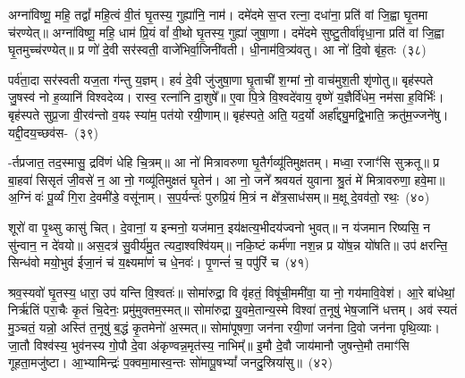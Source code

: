 {\anuvakamend[{भोज॑नानि॒ षड्विꣳ॑शतिश्च}]}%

अग्ना॑विष्णू॒ महि॒ तद्वां᳚ महि॒त्वं वी॒तं घृ॒तस्य॒ गुह्या॑नि॒ नाम॑। दमे॑दमे स॒प्त रत्ना॒ दधा॑ना॒ प्रति॑ वां जि॒ह्वा घृ॒तमा च॑रण्येत्॥ अग्ना॑विष्णू॒ महि॒ धाम॑ प्रि॒यं वां᳚ वी॒थो घृ॒तस्य॒ गुह्या॑ जुषा॒णा। दमे॑दमे सुष्टु॒तीर्वा॑वृधा॒ना प्रति॑ वां जि॒ह्वा घृ॒तमुच्च॑रण्येत्॥ प्र णो॑ दे॒वी सर॑स्वती॒ वाजे॑भिर्वा॒जिनी॑वती। धी॒नाम॑वि॒त्र्य॑वतु। आ नो॑ दि॒वो बृ॑ह॒तः~(३८)

पर्व॑ता॒दा सर॑स्वती यज॒ता ग॑न्तु य॒ज्ञम्। हवं॑ दे॒वी जु॑जुषा॒णा घृ॒ताची॑ श॒ग्मां नो॒ वाच॑मुश॒ती शृ॑णोतु॥ बृह॑स्पते जु॒षस्व॑ नो ह॒व्यानि॑ विश्वदेव्य। रास्व॒ रत्ना॑नि दा॒शुषे᳚॥ ए॒वा पि॒त्रे वि॒श्वदे॑वाय॒ वृष्णे॑ य॒ज्ञैर्वि॑धेम॒ नम॑सा ह॒विर्भिः॑। बृह॑स्पते सुप्र॒जा वी॒रव॑न्तो व॒यꣴ स्या॑म॒ पत॑यो रयी॒णाम्॥ बृह॑स्पते॒ अति॒ यद॒र्यो अर्\mbox{}हा᳚द्द्यु॒मद्वि॒भाति॒ क्रतु॑म॒ज्जने॑षु। यद्दी॒दय॒च्छव॑स-~(३९)

-र्तप्रजात॒ तद॒स्मासु॒ द्रवि॑णं धेहि चि॒त्रम्॥ आ नो॑ मित्रावरुणा घृ॒तैर्गव्यू॑तिमुक्षतम्। मध्वा॒ रजाꣳ॑सि सुक्रतू॥ प्र बा॒हवा॑ सिसृतं जी॒वसे॑ न॒ आ नो॒ गव्यू॑तिमुक्षतं घृ॒तेन॑। आ नो॒ जने᳚ श्रवयतं युवाना श्रु॒तं मे॑ मित्रावरुणा॒ हवे॒मा॥ अ॒ग्निं वः॑ पू॒र्व्यं गि॒रा दे॒वमी॑डे॒ वसू॑नाम्। स॒प॒र्यन्तः॑ पुरुप्रि॒यं मि॒त्रं न क्षे᳚त्र॒साध॑सम्॥ म॒क्षू दे॒वव॑तो॒ रथः॒~(४०)

शूरो॑ वा पृ॒थ्सु कासु॑ चित्। दे॒वानां॒ य इन्मनो॒ यज॑मान॒ इय॑क्षत्य॒भीदय॑ज्वनो भुवत्॥ न य॑जमान रिष्यसि॒ न सु॑न्वान॒ न दे॑वयो॥ अस॒दत्र॑ सु॒वीर्य॑मु॒त त्यदा॒श्वश्वि॑यम्॥ नकि॒ष्टं कर्म॑णा नश॒न्न प्र यो॑ष॒न्न यो॑षति॥ उप॑ क्षरन्ति॒ सिन्ध॑वो मयो॒भुव॑ ईजा॒नं च॑ य॒क्ष्यमा॑णं च धे॒नवः॑। पृ॒णन्तं॑ च॒ पपु॑रिं च~(४१)

श्रव॒स्यवो॑ घृ॒तस्य॒ धारा॒ उप॑ यन्ति वि॒श्वतः॑॥ सोमा॑रुद्रा॒ वि वृ॑हतं॒ विषू॑ची॒ममी॑वा॒ या नो॒ गय॑मावि॒वेश॑। आ॒रे बा॑धेथां॒ निर्\mbox{}ऋ॑तिं परा॒चैः कृ॒तं चि॒देनः॒ प्रमु॑मुक्तम॒स्मत्॥ सोमा॑रुद्रा यु॒वमे॒तान्य॒स्मे विश्वा॑ त॒नूषु॑ भेष॒जानि॑ धत्तम्। अव॑ स्यतं मु॒ञ्चतं॒ यन्नो॒ अस्ति॑ त॒नूषु॑ ब॒द्धं कृ॒तमेनो॑ अ॒स्मत्॥ सोमा॑पूषणा॒ जन॑ना रयी॒णां जन॑ना दि॒वो जन॑ना पृथि॒व्याः। जा॒तौ विश्व॑स्य॒ भुव॑नस्य गो॒पौ दे॒वा अ॑कृण्वन्न॒मृत॑स्य॒ नाभिम्᳚॥ इ॒मौ दे॒वौ जाय॑मानौ जुषन्ते॒मौ तमाꣳ॑सि गूहता॒मजु॑ष्टा। आ॒भ्यामिन्द्रः॑ प॒क्वमा॒मास्व॒न्तः सो॑मापू॒ष\-भ्यां᳚ जनदु॒स्रिया॑सु॥~(४२)

{\anuvakamend[{बृ॒ह॒तः शव॑सा॒ रथः॒ पपु॑रिं च दि॒वो जन॑ना॒ पञ्च॑विꣳशतिश्च}]}%
